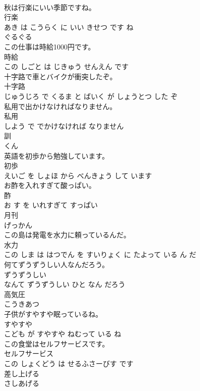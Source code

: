 \documentclass[8pt]{extreport}
\begin{document}
\begin{CJK}{UTF8}{min}
\\	秋は行楽にいい季節ですね。	
\\	行楽 
\\	あき は こうらく に いい きせつ です ね			
\\	ぐるぐる	
\\	この仕事は時給1000円です。	
\\	時給 
\\	この しごと は じきゅう せんえん です			
\\	十字路で車とバイクが衝突したぞ。	
\\	十字路 
\\	じゅうじろ で くるま と ばいく が しょうとつ した ぞ			
\\	私用で出かけなければなりません。	
\\	私用 
\\	しよう で でかけなければ なりません			
\\	訓	
\\	くん			
\\	英語を初歩から勉強しています。	
\\	初歩 
\\	えいご を しょほ から べんきょう して います			
\\	お酢を入れすぎて酸っぱい。	
\\	酢 
\\	お す を いれすぎて すっぱい			
\\	月刊	
\\	げっかん			
\\	この島は発電を水力に頼っているんだ。	
\\	水力 
\\	この しま は はつでん を すいりょく に たよって いる ん だ			
\\	何てずうずうしい人なんだろう。	
\\	ずうずうしい 
\\	なんて ずうずうしい ひと なん だろう			
\\	高気圧	
\\	こうきあつ			
\\	子供がすやすや眠っているね。	
\\	すやすや 
\\	こども が すやすや ねむって いる ね			
\\	この食堂はセルフサービスです。	
\\	セルフサービス 
\\	この しょくどう は せるふさーびす です			
\\	差し上げる	
\\	さしあげる			

\end{CJK}
\end{document}
